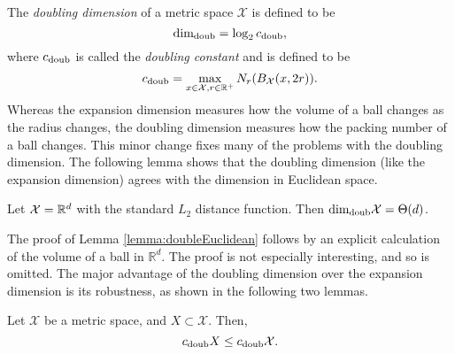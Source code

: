 \documentclass[../main.tex]{subfiles}
\newcommand{\set}[1]{\mathcal {#1}}
\newcommand{\radius}{r}
\newcommand{\minkdim}{\text{dim}_\textnormal{Mink}}
\newcommand{\doubdim}{\text{dim}_\textnormal{doub}}
\newcommand{\doubnum}{c_\textnormal{doub}}
\begin{document}
%

%

The \emph{doubling dimension} of a metric space $\set X$ is defined to be
\begin{equation}
    \doubdim = \log_2 \doubnum
    ,
\end{equation}
where $\doubnum$ is called the \emph{doubling constant} and is defined to be
\begin{equation}
    \doubnum = \max_{x\in\set X, \radius\in\R^+} N_\radius(B_{\set X}(x,2\radius))
    .
\end{equation}
Whereas the expansion dimension measures how the volume of a ball changes as the radius changes,
the doubling dimension measures how the packing number of a ball changes.
This minor change fixes many of the problems with the doubling dimension.
The following lemma shows that the doubling dimension (like the expansion dimension) agrees with the dimension in Euclidean space.
\begin{lemma}
    \label{lemma:doubleEuclidean}
    Let $\set X=\R^d$ with the standard $L_2$ distance function.
    Then $\doubdim\set X=\Theta(d)$.
\end{lemma}
\noindent
The proof of Lemma \ref{lemma:doubleEuclidean} follows by an explicit calculation of the volume of a ball in $\mathbb{R}^d$.
The proof is not especially interesting, and so is omitted.
The major advantage of the doubling dimension over the expansion dimension is its robustness,
as shown in the following two lemmas.


\begin{lemma}
    Let $\set X$ be a metric space, and $X\subset\set X$.
    Then,
    \begin{equation}
        \label{eq:doubnuminclusion}
        \doubnum X \le \doubnum \set X.
    \end{equation}
\end{lemma}
\end{document}
